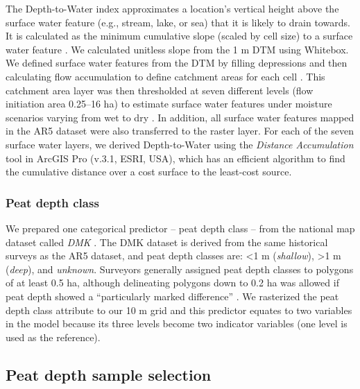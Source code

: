 \documentclass[soil, manuscript]{copernicus}
\begin{document}
The Depth-to-Water index \citep{murphyMappingWetlandsComparison2007} approximates a location's vertical height above the surface water feature (e.g., stream, lake, or sea) that it is likely to drain towards.
It is calculated as the minimum cumulative slope (scaled by cell size) to a surface water feature \citep[eq. 5 in][]{murphyTopographicModellingSoil2009}.
We calculated unitless slope from the 1 m DTM using Whitebox.
We defined surface water features from the DTM by filling depressions and then calculating flow accumulation to define catchment areas for each cell \citep{schonauerSpatiotemporalPredictionSoil2021, schonauerRcodeCalculatingDepthwater2021}.
This catchment area layer was then thresholded at seven different levels (flow initiation area 0.25--16 ha) to estimate surface water features under moisture scenarios varying from wet to dry \citep{murphyModellingMappingTopographic2011, agrenEvaluatingDigitalTerrain2014, schonauerSpatiotemporalPredictionSoil2021}.
In addition, all surface water features mapped in the AR5 dataset were also transferred to the raster layer.
For each of the seven surface water layers, we derived Depth-to-Water using the \emph{Distance Accumulation} tool in ArcGIS Pro (v.3.1, ESRI, USA), which has an efficient algorithm to find the cumulative distance over a cost surface to the least-cost source.

\subsubsection{Peat depth class}

We prepared one categorical predictor -- peat depth class -- from the national map dataset called \emph{DMK} \citep{ahlstromAR5Klassifikasjonssystem2019}.
The DMK dataset is derived from the same historical surveys as the AR5 dataset, and peat depth classes are: \textless1 m (\emph{shallow}), \textgreater1 m (\emph{deep}), and \emph{unknown}.
Surveyors generally assigned peat depth classes to polygons of at least 0.5 ha, although delineating polygons down to 0.2 ha was allowed if peat depth showed a ``particularly marked difference'' \citep{bjordalMarkslagsklassifikasjonOkonomiskKartverk2007}.
We rasterized the peat depth class attribute to our 10 m grid and this predictor equates to two variables in the model because its three levels become two indicator variables (one level is used as the reference).

\subsection{Peat depth sample selection}
\end{document}
